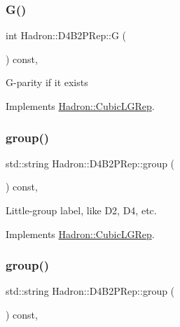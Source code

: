 \subsubsection{\texorpdfstring{G()}{G()}\hspace{0.1cm}{\footnotesize\ttfamily [2/2]}}
{\footnotesize\ttfamily int Hadron\+::\+D4\+B2\+P\+Rep\+::G (\begin{DoxyParamCaption}{ }\end{DoxyParamCaption}) const\hspace{0.3cm}{\ttfamily [inline]}, {\ttfamily [virtual]}}

G-\/parity if it exists 

Implements \mbox{\hyperlink{structHadron_1_1CubicLGRep_ace26f7b2d55e3a668a14cb9026da5231}{Hadron\+::\+Cubic\+L\+G\+Rep}}.

\mbox{\label{structHadron_1_1D4B2PRep_aa71574997466ab08fe9b29f7f35ff7f3}} 
\subsubsection{\texorpdfstring{group()}{group()}\hspace{0.1cm}{\footnotesize\ttfamily [1/2]}}
{\footnotesize\ttfamily std\+::string Hadron\+::\+D4\+B2\+P\+Rep\+::group (\begin{DoxyParamCaption}{ }\end{DoxyParamCaption}) const\hspace{0.3cm}{\ttfamily [inline]}, {\ttfamily [virtual]}}

Little-\/group label, like D2, D4, etc. 

Implements \mbox{\hyperlink{structHadron_1_1CubicLGRep_a9bdb14b519a611d21379ed96a3a9eb41}{Hadron\+::\+Cubic\+L\+G\+Rep}}.

\mbox{\label{structHadron_1_1D4B2PRep_aa71574997466ab08fe9b29f7f35ff7f3}} 
\subsubsection{\texorpdfstring{group()}{group()}\hspace{0.1cm}{\footnotesize\ttfamily [2/2]}}
{\footnotesize\ttfamily std\+::string Hadron\+::\+D4\+B2\+P\+Rep\+::group (\begin{DoxyParamCaption}{ }\end{DoxyParamCaption}) const\hspace{0.3cm}{\ttfamily [inline]}, {\ttfamily [virtual]}}

